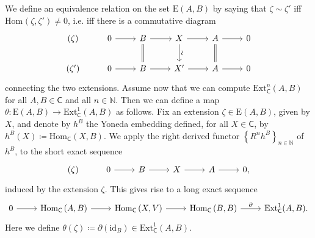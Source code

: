 \begin{rem}[]\label{rem:YonedaExensionTheta}
	We define an equivalence relation on the set $\mathrm{E}(A,B)$ by
	saying that $\zeta \sim \zeta'$ 
	iff $\mathrm{Hom}_{  } \left( \zeta, \zeta' \right) \neq 0$,
	i.e. iff there is a commutative diagram
	\begin{equation*}
	\begin{tikzcd}
		(\zeta) &
		0 \arrow[r, "", rightarrow] &
		B \arrow[r, "", rightarrow] 
		\arrow[d, "", equals] &
		X \arrow[r, "", rightarrow] 
		\arrow[d, "\rotatebox{90}{\(\sim\)}", rightarrow] &
		A \arrow[r, "", rightarrow] 
		\arrow[d, "", equals] &
		0\\
		(\zeta') &
		0 \arrow[r, "", rightarrow] &
		B \arrow[r, "", rightarrow] &
		X' \arrow[r, "", rightarrow] &
		A \arrow[r, "", rightarrow] &
		0
	\end{tikzcd}
	\end{equation*}
	connecting the two extensions.
	Assume now that we can compute $\mathrm{Ext}^n_{\mathsf{C}}(A, B)$
	for all $A,B \in \mathsf{C}$ and all $n \in \mathbb{N}$.
	Then we can define a map $\theta\colon \mathrm{E}(A,B) \to 
	\mathrm{Ext}^1_{\mathsf{C}}(A,B)$ as follows.
	Fix an extension $\zeta \in \mathrm{E}(A,B)$, given by $X$,
	and denote by $h^B$ the Yoneda
	embedding defined, for all $X \in \mathsf{C}$, by
	$h^B(X) \coloneqq \mathrm{Hom}_{\mathsf{C}} \left( X, B \right)$.
	We apply the right derived functor 
	$\left\{ R^n h^B \right\}_{n \in \mathbb{N}}$ of $h^B$, 
	to the short exact sequence
	\begin{equation*}
	\begin{tikzcd}
		(\zeta) &
		0 \arrow[r, "", rightarrow] &
		B \arrow[r, "", rightarrow] &
		X \arrow[r, "", rightarrow] &
		A \arrow[r, "", rightarrow] &
		0
	,\end{tikzcd}
	\end{equation*}
	induced by the extension $\zeta$.
	This gives rise to a long exact sequence
	\begin{equation*}
	\begin{tikzcd}
		0 \arrow[r, "", rightarrow] &
		\mathrm{Hom}_{\mathsf{C}} \left( A, B \right) \arrow[r, "", rightarrow] &
		\mathrm{Hom}_{\mathsf{C}} \left( X, V \right) \arrow[r, "", rightarrow] &
		\mathrm{Hom}_{\mathsf{C}} \left( B, B \right) \arrow[r, "\partial", rightarrow] &
		\mathrm{Ext}^1_{\mathsf{C}}(A,B)
	.\end{tikzcd}
	\end{equation*}
	Here we define $\theta(\zeta) \coloneqq \partial(\mathrm{id}_{ B }) \in \mathrm{Ext}^1_{\mathsf{C}}
	(A,B)$.
\end{rem}


